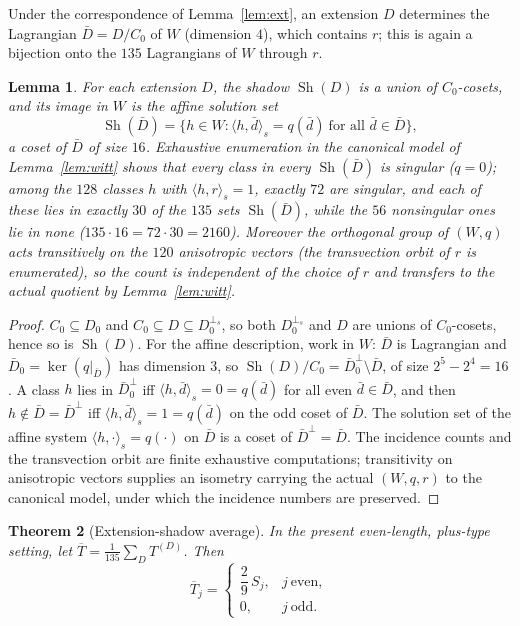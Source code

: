 \documentclass[11pt]{amsart}
\newtheorem{theorem}{Theorem}[section]
\newtheorem{lemma}[theorem]{Lemma}
\theoremstyle{definition}
\theoremstyle{remark}
\DeclareMathOperator{\Sh}{Sh}
\newcommand{\perps}{{\perp_s}}
\newcommand{\sform}[2]{\langle #1,#2\rangle_s}
\begin{document}
Under the correspondence of Lemma~\ref{lem:ext}, an extension $D$
determines the Lagrangian $\bar D=D/C_0$ of $W$ (dimension $4$), which
contains $r$; this is again a bijection onto the $135$ Lagrangians of $W$
through $r$.

\begin{lemma}\label{lem:extshadow}
For each extension $D$, the shadow $\Sh(D)$ is a union of $C_0$-cosets,
and its image in $W$ is the affine solution set
\[
\Sh(\bar D)=\{h\in W:\sform{h}{\bar d}=q(\bar d)\ \text{for all }
\bar d\in\bar D\},
\]
a coset of $\bar D$ of size $16$.  Exhaustive enumeration in the canonical
model of Lemma~\ref{lem:witt} shows that every class in every
$\Sh(\bar D)$ is singular ($q=0$); among the $128$ classes $h$ with
$\sform{h}{r}=1$, exactly $72$ are singular, and each of these lies in
exactly $30$ of the $135$ sets $\Sh(\bar D)$, while the $56$ nonsingular
ones lie in none ($135\cdot16=72\cdot30=2160$).  Moreover the orthogonal
group of $(W,q)$ acts transitively on the $120$ anisotropic vectors (the
transvection orbit of $r$ is enumerated), so the count is independent of
the choice of $r$ and transfers to the actual quotient by
Lemma~\ref{lem:witt}.
\end{lemma}

\begin{proof}
$C_0\subseteq D_0$ and $C_0\subseteq D\subseteq D_0^{\perps}$, so both
$D_0^{\perps}$ and $D$ are unions of $C_0$-cosets, hence so is $\Sh(D)$.
For the affine description, work in $W$: $\bar D$ is Lagrangian and
$\bar D_0=\ker(q|_{\bar D})$ has dimension $3$, so
$\Sh(D)/C_0=\bar D_0^{\perp}\setminus\bar D$, of size $2^5-2^4=16$.  A
class $h$ lies in $\bar D_0^{\perp}$ iff $\sform{h}{\bar d}=0=q(\bar d)$
for all even $\bar d\in\bar D$, and then $h\notin\bar D=\bar D^{\perp}$
iff $\sform{h}{\bar d}=1=q(\bar d)$ on the odd coset of $\bar D$.  The
solution set of the affine system $\sform{h}{\cdot}=q(\cdot)$ on $\bar D$
is a coset of $\bar D^{\perp}=\bar D$.  The incidence counts and the
transvection orbit are finite exhaustive computations; transitivity on
anisotropic vectors supplies an isometry carrying the actual $(W,q,r)$ to
the canonical model, under which the incidence numbers are preserved.
\end{proof}

\begin{theorem}[Extension-shadow average]\label{thm:tbar}
In the present even-length, plus-type setting, let
$\overline T=\frac{1}{135}\sum_D T^{(D)}$.  Then
\begin{equation}\label{eq:tbar}
\overline T_j=
\begin{cases}
\dfrac{2}{9}\,S_j, & j\ \text{even},\\[4pt]
0, & j\ \text{odd}.
\end{cases}
\end{equation}
\end{theorem}
\end{document}
